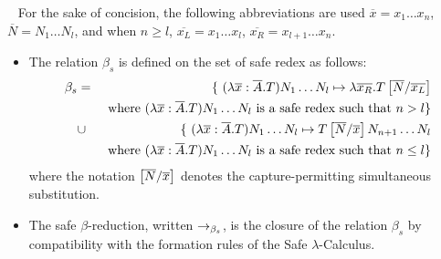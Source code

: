 \begin{dfn} \
\label{dfn:safereduction} For the sake of concision, the following
abbreviations are used $\overline{x} = x_1 \ldots x_n$,
$\overline{N} = N_1 \ldots N_l$, and when $n\geq l$, $\overline{x_L}
= x_1 \ldots x_l$, $\overline{x_R} = x_{l+1} \ldots x_n$.
\begin{itemize}
\item The relation $\beta_s$ is defined on the set of safe redex as follows:
\begin{eqnarray*}
\beta_s &=&
\{  \ (\lambda \overline{x} : \overline{A} . T) N_1 \ldots N_l \mapsto \lambda \overline{x_R}. T\left[ \overline{N}/\overline{x_L} \right]  \\
&& \mbox{ where $(\lambda \overline{x} : \overline{A} . T) N_1 \ldots N_l$ is a safe redex such that $n> l$}
\} \\
&\cup&
\{ \ (\lambda \overline{x} : \overline{A} . T) N_1 \ldots N_l \mapsto T\left[ \overline{N}/\overline{x} \right] N_{n+1} \ldots N_l  \\
&& \mbox{ where $(\lambda \overline{x} : \overline{A} . T) N_1 \ldots N_l$ is a safe redex such that $n\leq l$}
\}
\end{eqnarray*}
where the notation $\left[ \overline{N}/\overline{x} \right]$ denotes the capture-permitting simultaneous substitution.

\item
The safe $\beta$-reduction, written $\rightarrow_{\beta_s}$, is the closure of
the relation $\beta_s$ by compatibility with the formation rules of
the Safe $\lambda$-Calculus.
\end{itemize}
\end{dfn}



